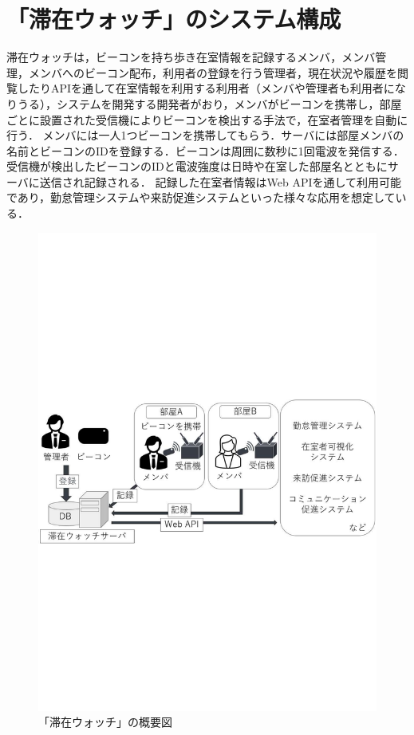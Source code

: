 

\section{「滞在ウォッチ」のシステム構成}\label{3.1}
滞在ウォッチは，ビーコンを持ち歩き在室情報を記録するメンバ，メンバ管理，メンバへのビーコン配布，利用者の登録を行う管理者，現在状況や履歴を閲覧したりAPIを通して在室情報を利用する利用者（メンバや管理者も利用者になりうる），システムを開発する開発者がおり，メンバがビーコンを携帯し，部屋ごとに設置された受信機によりビーコンを検出する手法で，在室者管理を自動に行う．
メンバには一人1つビーコンを携帯してもらう．サーバには部屋メンバの名前とビーコンのIDを登録する．ビーコンは周囲に数秒に1回電波を発信する．
受信機が検出したビーコンのIDと電波強度は日時や在室した部屋名とともにサーバに送信され記録される．
記録した在室者情報はWeb APIを通して利用可能であり，勤怠管理システムや来訪促進システムといった様々な応用を想定している．

\begin{figure}[h]
  \centering  %
  \includegraphics[clip,scale = 0.6]{image/system.pdf}
  \caption{「滞在ウォッチ」の概要図}    \label{StayWatchOverview}
\end{figure}

